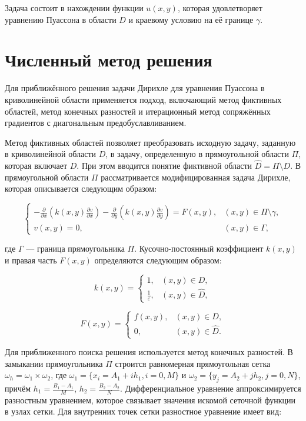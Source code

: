 \documentclass[12pt,a4paper]{article}
\begin{document}
    Задача состоит в нахождении функции $u(x, y)$, которая удовлетворяет уравнению Пуассона в области $D$ и краевому условию на её границе $\gamma$.


    \section{Численный метод решения}

    Для приближённого решения задачи Дирихле для уравнения Пуассона в криволинейной области применяется подход, включающий метод фиктивных областей, метод конечных разностей и итерационный метод сопряжённых градиентов с диагональным предобуславливанием.
    
    Метод фиктивных областей позволяет преобразовать исходную задачу, заданную в криволинейной области $D$, в задачу, определенную в прямоугольной области $\Pi$, которая включает $D$. При этом вводится понятие фиктивной области $\hat{D} = \Pi \setminus D$. В прямоугольной области $\Pi$ рассматривается модифицированная задача Дирихле, которая описывается следующим образом:
    
    $$
    \begin{cases}
    -\frac{\partial}{\partial x}\left(k(x, y)\frac{\partial v}{\partial x}\right) - \frac{\partial}{\partial y}\left(k(x, y)\frac{\partial v}{\partial y}\right) = F(x, y), & (x, y) \in \Pi \setminus \gamma, \\
    v(x, y) = 0, & (x, y) \in \Gamma,
    \end{cases}
    $$
    
    где $\Gamma$ — граница прямоугольника $\Pi$. Кусочно-постоянный коэффициент $k(x, y)$ и правая часть $F(x, y)$ определяются следующим образом:
    
    $$
    k(x, y) =
    \begin{cases}
    1, & (x, y) \in D, \\
    \frac{1}{\varepsilon}, & (x, y) \in \hat{D},
    \end{cases}
    $$
    
    $$
    F(x, y) =
    \begin{cases}
    f(x, y), & (x, y) \in D, \\
    0, & (x, y) \in \hat{D}.
    \end{cases}
    $$
    
    Для приближенного поиска решения используется метод конечных разностей. В замыкании прямоугольника $\Pi$ строится равномерная прямоугольная сетка $\omega_h = \omega_1 \times \omega_2$, где $\omega_1 = \{x_i = A_1 + ih_1, i = 0, M\}$ и $\omega_2 = \{y_j = A_2 + jh_2, j = 0, N\}$, причём $h_1 = \frac{B_1 - A_1}{M}$, $h_2 = \frac{B_2 - A_2}{N}$. Дифференциальное уравнение аппроксимируется разностным уравнением, которое связывает значения искомой сеточной функции в узлах сетки. Для внутренних точек сетки разностное уравнение имеет вид:
\end{document}

